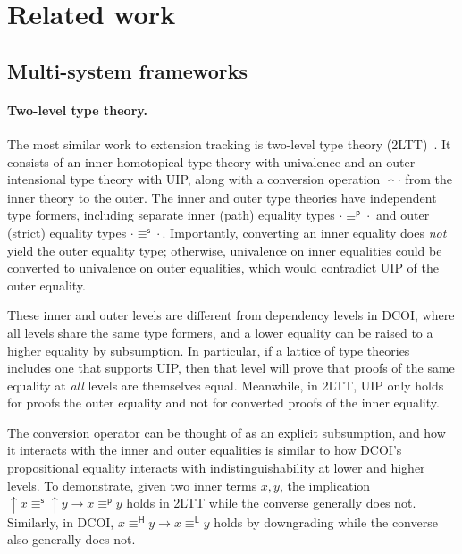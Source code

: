 \documentclass{article}
\newcommand{\HH}{\mathsf{H}}
\newcommand{\LL}{\mathsf{L}}
\newcommand{\oo}{\mathsf{s}}
\newcommand{\ii}{\mathsf{p}}
\begin{document}
\section{Related work} \label{sec:related}

\subsection{Multi-system frameworks}

\paragraph{Two-level type theory.}
The most similar work to extension tracking is two-level type theory (2LTT)~\citep{2ls,2ltt}.
It consists of an inner homotopical type theory with univalence
and an outer intensional type theory with UIP,
along with a conversion operation $\mathop{\uparrow} \cdot$ from the inner theory to the outer.
The inner and outer type theories have independent type formers,
including separate inner (path) equality types $\cdot \equiv^\ii \cdot$
and outer (strict) equality types $\cdot \equiv^\oo \cdot$.
Importantly, converting an inner equality does \emph{not} yield the outer equality type;
otherwise, univalence on inner equalities could be converted to univalence on outer equalities,
which would contradict UIP of the outer equality.

These inner and outer levels are different from dependency levels in DCOI,
where all levels share the same type formers,
and a lower equality can be raised to a higher equality by subsumption.
In particular, if a lattice of type theories includes one that supports UIP,
then that level will prove that proofs of the same equality at \emph{all} levels are themselves equal.
Meanwhile, in 2LTT, UIP only holds for proofs the outer equality
and not for converted proofs of the inner equality.

The conversion operator can be thought of as an explicit subsumption,
and how it interacts with the inner and outer equalities
is similar to how DCOI's propositional equality interacts with indistinguishability
at lower and higher levels.
To demonstrate, given two inner terms $x, y$,
the implication $\mathop{\uparrow} x \equiv^\oo \mathop{\uparrow} y \to x \equiv^\ii y$
holds in 2LTT while the converse generally does not.
Similarly, in DCOI, $x \equiv^\HH y \to x \equiv^\LL y$ holds by downgrading
while the converse also generally does not.
\end{document}
